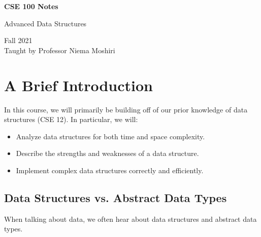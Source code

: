 \documentclass[letterpaper]{article}
\begin{document}
\begin{titlepage}
    \begin{center}
        \vspace*{1cm}
            
        \Huge
        \textbf{CSE 100 Notes}
            
        \vspace{0.5cm}
        \LARGE
        Advanced Data Structures
            
        \vspace{1.5cm}
            
        \vfill
            
        Fall 2021\\
        Taught by Professor Niema Moshiri
    \end{center}
\end{titlepage}


\newpage 

\begingroup
    \renewcommand\contentsname{Table of Contents}
    \tableofcontents
\endgroup

\newpage
{}


\section{A Brief Introduction}
In this course, we will primarily be building off of our prior knowledge of data structures (CSE 12). In particular, we will: 
\begin{itemize}
    \item Analyze data structures for both time and space complexity. 
    \item Describe the strengths and weaknesses of a data structure. 
    \item Implement complex data structures correctly and efficiently. 
\end{itemize}


\subsection{Data Structures vs. Abstract Data Types}
When talking about data, we often hear about data structures and abstract data types. 
\end{document}
